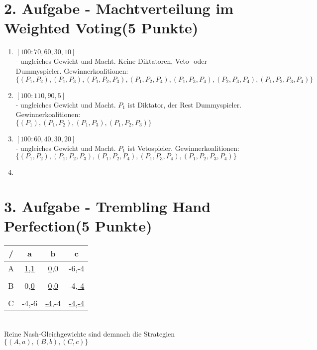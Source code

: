 \documentclass[a4paper, 11pt]{article}
\newcommand{\RM}[1]{\MakeUppercase{\romannumeral #1}}
\begin{document}
\section*{2. Aufgabe - Machtverteilung im Weighted Voting\hfill {\small (5 Punkte)}}
\begin{enumerate}

\item 
$[100: 70, 60, 30, 10]$\\
- ungleiches Gewicht und Macht. Keine Diktatoren, Veto- oder Dummyspieler. Gewinnerkoalitionen:\\
$\{(P_1,P_2), (P_1,P_3), (P_1,P_2,P_3), (P_1,P_2,P_4), (P_1,P_3,P_4), (P_2,P_3,P_4), (P_1,P_2,P_3,P_4)\}$

\item$[100: 110, 90, 5]$\\
- ungleiches Gewicht und Macht. $P_1$ ist Diktator, der Rest Dummyspieler. Gewinnerkoalitionen:\\
$\{(P_1), (P_1,P_2), (P_1,P_3), (P_1,P_2,P_3)\}$

\item
$[100: 60, 40, 30, 20]$\\
- ungleiches Gewicht und Macht. $P_1$ ist Vetospieler. Gewinnerkoalitionen:\\
$\{(P_1,P_2), (P_1,P_2,P_3), (P_1,P_2,P_4), (P_1,P_3,P_4), (P_1,P_2,P_3,P_4)\}$
\item
\end{enumerate}
\section*{3. Aufgabe - Trembling Hand Perfection\hfill {\small (5 Punkte)}}
\begin{tabular}{c | ccc}
	\RM{1}/\RM{2} & a & b & c \\ \hline
	A & \underline{1,1} & \underline{0},0 & -6,-4 \\
	\\
	B & 0,\underline{0} & \underline{0,0} & -4,\underline{-4} \\
	\\
	C & -4,-6 & \underline{-4},-4 & \underline{-4,-4} 
\end{tabular}\\

Reine Nash-Gleichgewichte sind demnach die Strategien $\{(A,a),(B,b),(C,c)\}$\\
\end{document}
